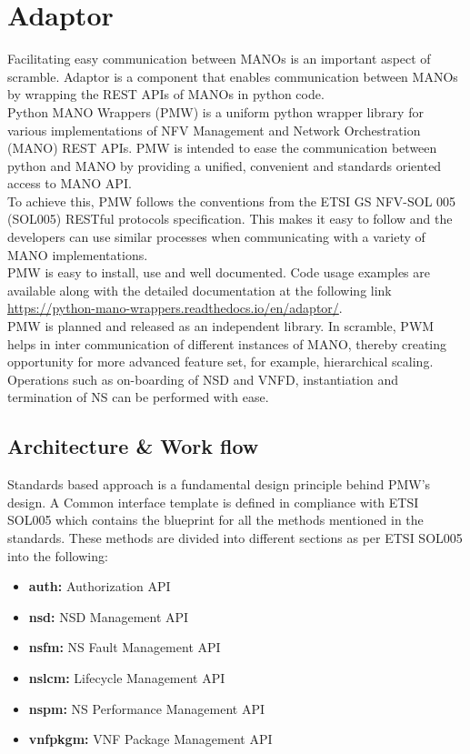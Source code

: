 \section{Adaptor}

Facilitating easy communication between MANOs is an important aspect of scramble. 
Adaptor is a component that enables communication between MANOs by wrapping the REST APIs of MANOs in python code.\\

Python MANO Wrappers (PMW) is a uniform python wrapper library for various implementations of NFV Management and Network Orchestration (MANO) REST APIs. 
PMW is intended to ease the communication between python and MANO by providing a unified, convenient and standards oriented access to MANO API.\\

To achieve this, PMW follows the conventions from the ETSI GS NFV-SOL 005 (SOL005) RESTful protocols specification. 
This makes it easy to follow and the developers can use similar processes when communicating with a variety of MANO implementations.\\

PMW is easy to install, use and well documented. 
Code usage examples are available along with the detailed documentation at the following link \url{https://python-mano-wrappers.readthedocs.io/en/adaptor/}. \\

PMW is planned and released as an independent library. 
In scramble, PWM helps in inter communication of different instances of MANO, thereby creating opportunity for more advanced feature set, for example, hierarchical scaling. 
Operations such as on-boarding of NSD and VNFD, instantiation and termination of NS can be performed with ease.

\subsection{Architecture \& Work flow}
Standards based approach is a fundamental design principle behind PMW's design. 
A Common interface template is defined in compliance with ETSI SOL005 which contains the blueprint for all the methods mentioned in the standards. 
These methods are divided into different sections as per ETSI SOL005 into the following:

\begin{itemize}
	\item \textbf{auth: }Authorization API
	\item \textbf{nsd: }NSD Management API
	\item \textbf{nsfm: }NS Fault Management API
	\item \textbf{nslcm: }Lifecycle Management API
	\item \textbf{nspm: }NS Performance Management API
	\item \textbf{vnfpkgm: }VNF Package Management API
\end{itemize} 


